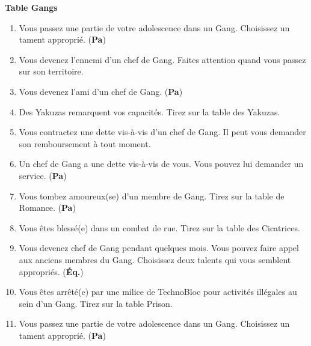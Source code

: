 \documentclass[11pt,twoside,a4paper]{article}
\begin{document}
\begin{multicols*}{2}
\textbf{Table Gangs  } %
\begin{enumerate}
	\footnotesize
	\item[2] Vous passez une partie de votre adolescence dans un Gang. Choisissez un tament appropri{\'e}. (\textbf{Pa})
	\item[3] Vous devenez l'ennemi d'un chef de Gang. Faites attention quand vous passez sur son territoire. 
	\item[4] Vous devenez l'ami d'un chef de Gang. (\textbf{Pa})
	\item[5] Des Yakuzas remarquent vos capacit{\'e}s. Tirez sur la table des Yakuzas. 
	\item[6] Vous contractez une dette vis-{\`a}-vis d'un chef de Gang. Il peut vous demander son remboursement {\`a} tout moment. 
	\item[7] Un chef de Gang a une dette vis-{\`a}-vis de vous. Vous pouvez lui demander un service. (\textbf{Pa})
	\item[8] Vous tombez amoureux(se) d'un membre de Gang. Tirez sur la table de Romance. (\textbf{Pa})
	\item[9] Vous {\^e}tes bless{\'e}(e) dans un combat de rue. Tirez sur la table des Cicatrices. 
	\item[10] Vous devenez chef de Gang pendant quelques mois. Vous pouvez faire appel aux anciens membres du Gang. Choisissez deux talents qui vous semblent appropri{\'e}s. (\textbf{{\'E}q.})
	\item[11] Vous {\^e}tes arr{\^e}t{\'e}(e) par une milice de TechnoBloc pour activit{\'e}s ill{\'e}gales au sein d'un Gang. Tirez sur la table Prison. 
	\item[12] Vous passez une partie de votre adolescence dans un Gang. Choisissez un tament appropri{\'e}. (\textbf{Pa})
\end{enumerate}


\end{multicols*}
\end{document}
